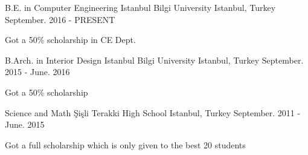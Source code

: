 


\begin{cventries}


\cventry
{B.E. in Computer Engineering} %
{Istanbul Bilgi University} %
{Istanbul, Turkey} %
{September. 2016 - PRESENT} %
{ %
\begin{cvitems}
\item {Got a 50\% scholarship in CE Dept.}
\end{cvitems}
}

\cventry
{B.Arch. in Interior Design} %
{Istanbul Bilgi University} %
{Istanbul, Turkey} %
{September. 2015 - June. 2016} %
{ %
\begin{cvitems}
\item {Got a 50\% scholarship}
\end{cvitems}
}

\cventry
{Science and Math} %
{Şişli Terakki High School } %
{Istanbul, Turkey} %
{September. 2011 - June. 2015} %
{ %
\begin{cvitems}
\item {Got a full scholarship which is only given to the best 20 students}
\end{cvitems}
}



\end{cventries}